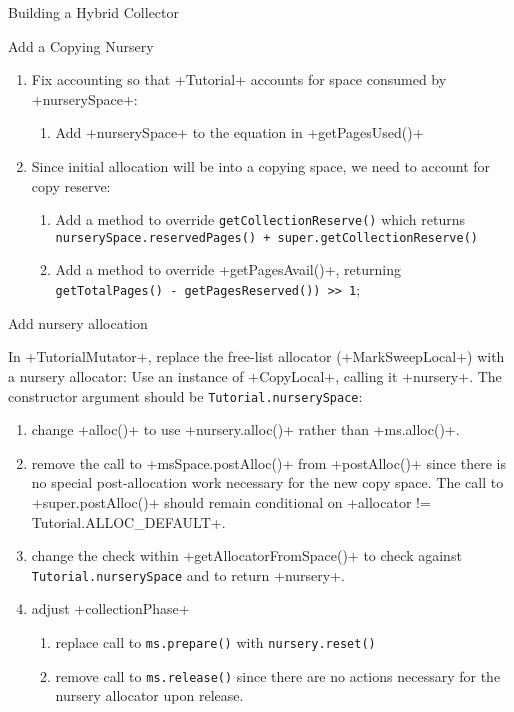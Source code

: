 \begin{chapter}{Building a Hybrid Collector}
\begin{section}{Add a Copying Nursery}
\begin{enumerate}
\begin{enumerate}
      \item Fix accounting so that \spverb+Tutorial+ accounts for space consumed by \spverb+nurserySpace+:
         \begin{enumerate}
           \item Add \spverb+nurserySpace+ to the equation in \spverb+getPagesUsed()+
         \end{enumerate}
      \item Since initial allocation will be into a copying space, we need to account for copy reserve:
         \begin{enumerate}
           \item Add a method to override \texttt{get\-Col\-lec\-tion\-Re\-serve()} which returns \texttt{nur\-se\-ry\-Spa\-ce.re\-ser\-ved\-Pa\-ges() + su\-per.get\-Col\-lec\-tion\-Re\-ser\-ve()}
           \item Add a method to override \spverb+getPagesAvail()+, returning \texttt{get\-To\-tal\-Pa\-ges() - get\-Pa\-ges\-Re\-ser\-ved()) >> 1};
         \end{enumerate}
    \end{enumerate}
\end{enumerate}

\end{section}

\begin{section}{Add nursery allocation}

In \spverb+TutorialMutator+, replace the free-list allocator (\spverb+MarkSweepLocal+) with a nursery allocator: Use an instance of \spverb+CopyLocal+, calling it \spverb+nursery+. The constructor argument should be \texttt{Tu\-to\-rial.nur\-se\-ry\-Spa\-ce}:
  \begin{enumerate}
    \item change \spverb+alloc()+ to use \spverb+nursery.alloc()+ rather than \spverb+ms.alloc()+.
    \item remove the call to \spverb+msSpace.postAlloc()+ from \spverb+postAlloc()+ since there is no special post-allocation work necessary for the new copy space. The call to \spverb+super.postAlloc()+ should remain conditional on \spverb+allocator != Tutorial.ALLOC_DEFAULT+.
    \item change the check within \spverb+getAllocatorFromSpace()+ to check against \texttt{Tu\-to\-rial.nur\-se\-ry\-Spa\-ce} and to return \spverb+nursery+.
    \item adjust \spverb+collectionPhase+
      \begin{enumerate}
        \item replace call to \verb+ms.prepare()+ with \verb+nursery.reset()+
        \item remove call to \verb+ms.release()+ since there are no actions necessary for the nursery allocator upon release.
      \end{enumerate}
  \end{enumerate}
\end{section}


\end{chapter}
